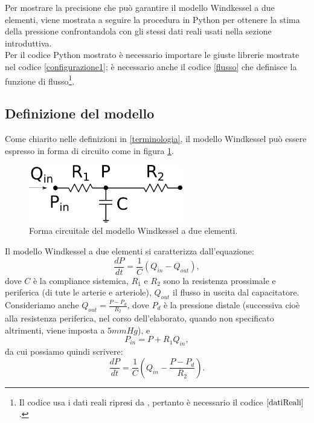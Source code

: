 \vspace{1cm}
Per mostrare la precisione che può garantire il modello Windkessel a due elementi, viene mostrata a seguire la procedura in Python per ottenere la stima della pressione confrontandola con gli stessi dati reali usati nella sezione introduttiva.\\
Per il codice Python mostrato è necessario importare le giuste librerie mostrate nel codice \ref{configurazione1}; è necessario anche il codice \ref{flusso} che definisce la funzione di flusso\footnote{Il codice usa i dati reali ripresi da \cite{westerhof_arterial_2008}, pertanto è necessario il codice $\ref{datiReali}$.}.


\newpage

\subsection{Definizione del modello}
Come chiarito nelle definizioni in \ref{terminologia}, il modello Windkessel può essere espresso in forma di circuito come in figura \ref{circuito}.

\vspace{1cm}

\begin{figure}[h]
    \centering
    \includegraphics[width=0.6\textwidth]{images/Windkessel/Windkessel2Element.png}
    \caption{Forma circuitale del modello Windkessel a due elementi.}
    \label{circuito}
\end{figure}

Il modello Windkessel a due elementi si caratterizza dall'equazione:
\[
\frac{dP}{dt}=\frac{1}{C}(Q_{in}-Q_{out}),
\]
dove $C$ è la compliance sistemica, $R_1$ e $R_2$ sono la resistenza prossimale e periferica (di tute le arterie e arteriole), $Q_{out}$ il flusso in uscita dal capacitatore.\\
Consideriamo anche $Q_{out}=\frac{P-P_d}{R_2}$, dove $P_d$ è la pressione distale (successiva cioè alla resistenza periferica, nel corso dell'elaborato, quando non specificato altrimenti, viene imposta a $5 mmHg$), e
\begin{equation}\label{Pin}
    P_{in}=P+R_1Q_{in},
\end{equation}
da cui possiamo quindi scrivere:
\begin{equation}\label{equation}
\frac{dP}{dt}=\frac{1}{C}\left( Q_{in}-\frac{P-P_d}{R_2}\right).
\end{equation}



